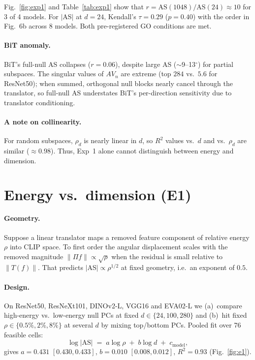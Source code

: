 \documentclass[10pt,twocolumn]{article}
\begin{document}
Fig.~\ref{fig:exp1} and Table~\ref{tab:exp1} show that $r{=}\mathrm{AS}(1048)/\mathrm{AS}(24)\approx10$ for 3 of 4 models.
For $|$AS$|$ at $d{=}24$, Kendall's $\tau{=}0.29$ ($p{=}0.40$) with the order in Fig.~6b across 8 models.
Both pre-registered GO conditions are met.

\paragraph{BiT anomaly.}
BiT's full-null AS collapses ($r{=}0.06$), despite large AS ($\sim$9--13$^\circ$) for partial subspaces.
The singular values of $A V_n$ are extreme (top $284$ vs.\ $5.6$ for ResNet50); when summed, orthogonal null blocks nearly cancel through the translator, so full-null AS understates BiT's per-direction sensitivity due to translator conditioning.

\paragraph{A note on collinearity.}
For random subspaces, $\rho_d$ is nearly linear in $d$, so $R^2$ values vs.\ $d$ and vs.\ $\rho_d$ are similar ($\approx0.98$).
Thus, Exp~1 alone cannot distinguish between energy and dimension.

\section{Energy vs.\ dimension (E1)}
\vspace{-0.2em}
\paragraph{Geometry.}
Suppose a linear translator maps a removed feature component of relative energy $\rho$ into CLIP space. To first order the angular displacement scales with the removed magnitude $\|\Pi f\|\propto\sqrt{\rho}$ when the residual is small relative to $\|T(f)\|$.
That predicts $|$AS$|\propto\rho^{1/2}$ at fixed geometry, i.e.\ an exponent of $0.5$.

\paragraph{Design.}
On ResNet50, ResNeXt101, DINOv2-L, VGG16 and EVA02-L we (a)~compare high-energy vs.\ low-energy null PCs at fixed $d\in\{24,100,280\}$ and (b)~hit fixed $\rho\in\{0.5\%,2\%,8\%\}$ at several $d$ by mixing top/bottom PCs.
Pooled fit over 76 feasible cells:
\[
\log|\mathrm{AS}| \;=\; a\log\rho \;+\; b\log d \;+\; c_{\mathrm{model}},
\]
gives $a{=}0.431$ $[0.430,0.433]$, $b{=}0.010$ $[0.008,0.012]$, $R^2{=}0.93$ (Fig.~\ref{fig:e1}).
\end{document}
